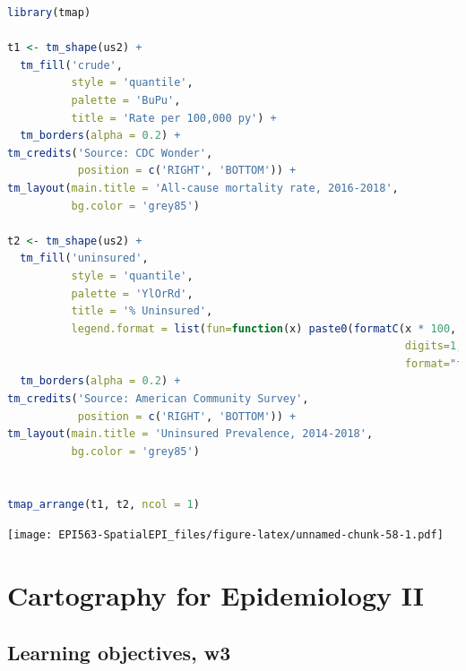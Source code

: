 \documentclass[
]{book}
\begin{document}
\begin{lstlisting}[language=R]
library(tmap)

t1 <- tm_shape(us2) + 
  tm_fill('crude',
          style = 'quantile',
          palette = 'BuPu',
          title = 'Rate per 100,000 py') + 
  tm_borders(alpha = 0.2) +
tm_credits('Source: CDC Wonder',
           position = c('RIGHT', 'BOTTOM')) + 
tm_layout(main.title = 'All-cause mortality rate, 2016-2018',
          bg.color = 'grey85')

t2 <- tm_shape(us2) + 
  tm_fill('uninsured',
          style = 'quantile',
          palette = 'YlOrRd',
          title = '% Uninsured',
          legend.format = list(fun=function(x) paste0(formatC(x * 100, 
                                                              digits=1, 
                                                              format="f"), "%"))) +
  tm_borders(alpha = 0.2) +
tm_credits('Source: American Community Survey',
           position = c('RIGHT', 'BOTTOM')) + 
tm_layout(main.title = 'Uninsured Prevalence, 2014-2018',
          bg.color = 'grey85')


tmap_arrange(t1, t2, ncol = 1)
\end{lstlisting}

\texttt{[image: EPI563-SpatialEPI\_files/figure-latex/unnamed-chunk-58-1.pdf]}

\hypertarget{cartography-for-epidemiology-ii}{%
\chapter{Cartography for Epidemiology II}\label{cartography-for-epidemiology-ii}}

\hypertarget{learning-objectives-w3}{%
\section{Learning objectives, w3}\label{learning-objectives-w3}}

 
  \providecommand{\huxb}[2]{\arrayrulecolor[RGB]{#1}\global\arrayrulewidth=#2pt}
  \providecommand{\huxvb}[2]{\color[RGB]{#1}\vrule width #2pt}
  \providecommand{\huxtpad}[1]{\rule{0pt}{#1}}
  \providecommand{\huxbpad}[1]{\rule[-#1]{0pt}{#1}}
\end{document}
